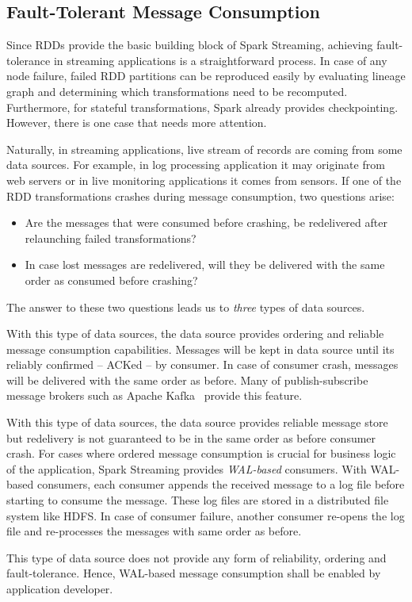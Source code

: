 \subsection{Fault-Tolerant Message Consumption}
Since RDDs provide the basic building block of Spark Streaming, achieving fault-tolerance in streaming applications is a straightforward process. In case of any node failure, failed RDD partitions can be reproduced easily by evaluating lineage graph and determining which transformations need to be recomputed. Furthermore, for stateful transformations, Spark already provides checkpointing. However, there is one case that needs more attention.

Naturally, in streaming applications, live stream of records are coming from some data sources. For example, in log processing application it may originate from web servers or in live monitoring applications it comes from sensors. If one of the RDD transformations crashes during message consumption, two questions arise:
\begin{itemize}
    \item Are the messages that were consumed before crashing, be redelivered after relaunching failed transformations?
    \item In case lost messages are redelivered, will they be delivered with the same order as consumed before crashing?
\end{itemize}
The answer to these two questions leads us to \emph{three} types of data sources.
\begin{description}[leftmargin=0pt]
    \item[Reliable Ordered] With this type of data sources, the data source provides ordering and reliable message consumption capabilities. Messages will be kept in data source until its reliably confirmed -- ACKed -- by consumer. In case of consumer crash, messages will be delivered with the same order as before. Many of publish-subscribe message brokers such as Apache Kafka~\cite{kafka} provide this feature.
    \item[Reliable Unordered] With this type of data sources, the data source provides reliable message store but redelivery is not guaranteed to be in the same order as before consumer crash. For cases where ordered message consumption is crucial for business logic of the application, Spark Streaming provides \emph{WAL-based} consumers. With WAL-based consumers, each consumer appends the received message to a log file before starting to consume the message. These log files are stored in a distributed file system like HDFS. In case of consumer failure, another consumer re-opens the log file and re-processes the messages with same order as before.
    \item[Unreliable] This type of data source does not provide any form of reliability, ordering and fault-tolerance. Hence, WAL-based message consumption shall be enabled by application developer.
\end{description}

